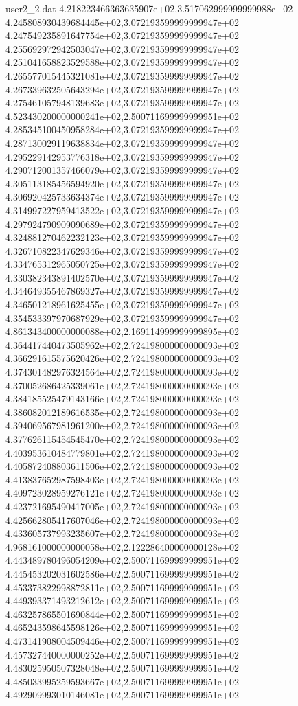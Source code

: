 \begin{filecontents}{user2_2.dat}
4.218223466363635907e+02,3.517062999999999988e+02
4.245808930439684445e+02,3.072193599999999947e+02
4.247549235891647754e+02,3.072193599999999947e+02
4.255692972942503047e+02,3.072193599999999947e+02
4.251041658823529588e+02,3.072193599999999947e+02
4.265577015445321081e+02,3.072193599999999947e+02
4.267339632505643294e+02,3.072193599999999947e+02
4.275461057948139683e+02,3.072193599999999947e+02
4.523430200000000241e+02,2.500711699999999951e+02
4.285345100450958284e+02,3.072193599999999947e+02
4.287130029119638834e+02,3.072193599999999947e+02
4.295229142953776318e+02,3.072193599999999947e+02
4.290712001357466079e+02,3.072193599999999947e+02
4.305113185456594920e+02,3.072193599999999947e+02
4.306920425733634374e+02,3.072193599999999947e+02
4.314997227959413522e+02,3.072193599999999947e+02
4.297924790909090689e+02,3.072193599999999947e+02
4.324881270462232123e+02,3.072193599999999947e+02
4.326710822347629346e+02,3.072193599999999947e+02
4.334765312965050725e+02,3.072193599999999947e+02
4.330382343891402570e+02,3.072193599999999947e+02
4.344649355467869327e+02,3.072193599999999947e+02
4.346501218961625455e+02,3.072193599999999947e+02
4.354533397970687929e+02,3.072193599999999947e+02
4.861343400000000088e+02,2.169114999999999895e+02
4.364417440473505962e+02,2.724198000000000093e+02
4.366291615575620426e+02,2.724198000000000093e+02
4.374301482976324564e+02,2.724198000000000093e+02
4.370052686425339061e+02,2.724198000000000093e+02
4.384185525479143166e+02,2.724198000000000093e+02
4.386082012189616535e+02,2.724198000000000093e+02
4.394069567981961200e+02,2.724198000000000093e+02
4.377626115454545470e+02,2.724198000000000093e+02
4.403953610484779801e+02,2.724198000000000093e+02
4.405872408803611506e+02,2.724198000000000093e+02
4.413837652987598403e+02,2.724198000000000093e+02
4.409723028959276121e+02,2.724198000000000093e+02
4.423721695490417005e+02,2.724198000000000093e+02
4.425662805417607046e+02,2.724198000000000093e+02
4.433605737993235607e+02,2.724198000000000093e+02
4.968161000000000058e+02,2.122286400000000128e+02
4.443489780496054209e+02,2.500711699999999951e+02
4.445453202031602586e+02,2.500711699999999951e+02
4.453373822998872811e+02,2.500711699999999951e+02
4.449393371493212612e+02,2.500711699999999951e+02
4.463257865501690844e+02,2.500711699999999951e+02
4.465243598645598126e+02,2.500711699999999951e+02
4.473141908004509446e+02,2.500711699999999951e+02
4.457327440000000252e+02,2.500711699999999951e+02
4.483025950507328048e+02,2.500711699999999951e+02
4.485033995259593667e+02,2.500711699999999951e+02
4.492909993010146081e+02,2.500711699999999951e+02

\end{filecontents}
